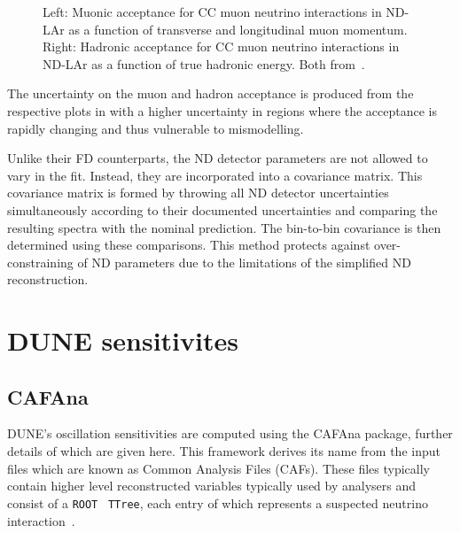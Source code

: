 \begin{figure}[h]
	\begin{minipage}[t]{.5\textwidth}
		\begin{adjustbox}{max totalsize=\linewidth, center}
			
		\end{adjustbox}
	\end{minipage}
	\hfill
	\begin{minipage}[t]{.5\textwidth}
		\begin{adjustbox}{max totalsize=\linewidth, center}
			
		\end{adjustbox}
	\end{minipage}
	\caption[Muonic and hadronic acceptance for CC neutrino interactions in ND-LAr]{Left: Muonic acceptance for CC muon neutrino interactions in ND-LAr as a function of transverse and longitudinal muon momentum. Right: Hadronic acceptance for CC muon neutrino interactions in ND-LAr as a function of true hadronic energy. Both from~\cite{Abi:2020qib}.}
	\label{fig:ndAcceptance}
\end{figure}

The uncertainty on the muon and hadron acceptance is produced from the respective plots in  with a higher uncertainty in regions where the acceptance is rapidly changing and thus vulnerable to mismodelling.

Unlike their FD counterparts, the ND detector parameters are not allowed to vary in the fit.
Instead, they are incorporated into a covariance matrix.
This covariance matrix is formed by throwing all ND detector uncertainties simultaneously according to their documented uncertainties and comparing the resulting spectra with the nominal prediction.
The bin-to-bin covariance is then determined using these comparisons.
This method protects against over-constraining of ND parameters due to the limitations of the simplified ND reconstruction.

\section{DUNE sensitivites}
\label{sec:dune_lbl:sensitivities}

\subsection{CAFAna}
\label{sec:dune_lbl:sensitivities:cafana}

DUNE's oscillation sensitivities are computed using the CAFAna package, further details of which are given here.
This framework derives its name from the input files which are known as Common Analysis Files (CAFs).
These files typically contain higher level reconstructed variables typically used by analysers and consist of a \texttt{ROOT}~\cite{root} \texttt{TTree}, each entry of which represents a suspected neutrino interaction~\cite{backhouse2015}.

